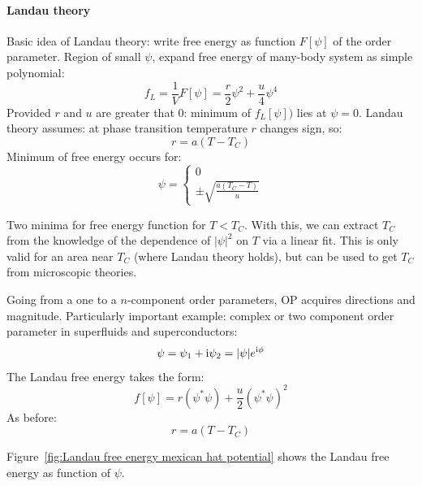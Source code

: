 \documentclass[../notes.tex]{subfiles}
\begin{document}
\paragraph{Landau theory} 

Basic idea of Landau theory: write free energy as function \(F[\psi]\) of the order parameter.
Region of small \(\psi\), expand free energy of many-body system as simple polynomial:
\begin{equation}
	f_{L} = \frac{1}{V} F[\psi] = \frac{r}{2} \psi^2 + \frac{u}{4} \psi^4
\end{equation}
Provided \(r\) and \(u\) are greater that \(0\): minimum of \(f_L [\psi])\) lies at \(\psi = 0\).
Landau theory assumes: at phase transition temperature \(r\) changes sign, so:
\begin{equation}
	r = a(T - T_C)
\end{equation}
Minimum of free energy occurs for:
\begin{equation}
	\psi = \begin{cases}
		0 \\
		\pm \sqrt{\frac{a (T_C - T)}{u} }
	\end{cases}
\end{equation}



Two minima for free energy function for \(T < T_C\).
With this, we can extract \(T_C\) from the knowledge of the dependence of \(\vert \psi \vert^2\) on \(T\) via a linear fit.
This is only valid for an area near \(T_C\) (where Landau theory holds), but can be used to get \(T_C\) from microscopic theories.

Going from a one to a \(n\)-component order parameters, OP acquires directions and magnitude.
Particularly important example: complex or two component order parameter in superfluids and superconductors:
\begin{equation}
	\psi = \psi_1 + \mathrm{i} \psi_2 = \vert \psi \vert e^{\mathrm{i} \phi}
\end{equation}
The Landau free energy takes the form:
\begin{equation}
	f[\psi] = r(\psi^* \psi) + \frac{u}{2} (\psi^* \psi)^2
\end{equation}
As before:
\begin{equation}
	r = a(T - T_C)
\end{equation}

Figure~\ref{fig:Landau free energy mexican hat potential} shows the Landau free energy as function of \(\psi\).
\end{document}
